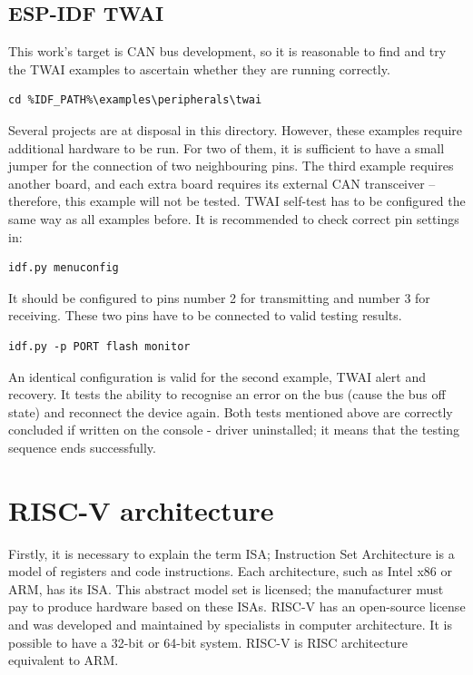 \documentclass{ctuthesis}
\begin{document}
 \subsection{ESP-IDF TWAI}
 This work’s target is CAN bus development, so it is reasonable to find and try the TWAI examples to ascertain whether they are running correctly.
\begin{verbatim}
cd %IDF_PATH%\examples\peripherals\twai
\end{verbatim}
Several projects are at disposal in this directory.  However, these examples require additional hardware to be run. For two of them, it is sufficient to have a small jumper for the connection of two neighbouring pins. The third example requires another board, and each extra board requires its external CAN transceiver – therefore, this example will not be tested.
TWAI self-test has to be configured the same way as all examples before. It is recommended to check correct pin settings in:
\begin{verbatim}
idf.py menuconfig
\end{verbatim}
It should be configured to pins number 2 for transmitting and number 3 for receiving. These two pins have to be connected to valid testing results.
\begin{verbatim}
idf.py -p PORT flash monitor
\end{verbatim}
An identical configuration is valid for the second example, TWAI alert and recovery. It tests the ability to recognise an error on the bus (cause the bus off state) and reconnect the device again. Both tests mentioned above are correctly concluded if written on the console - driver uninstalled; it means that the testing sequence ends successfully.

 \section{RISC-V architecture}
  Firstly, it is necessary to explain the term ISA; Instruction Set Architecture is a model of registers and code instructions\cite{risc-v}. Each architecture, such as Intel x86 or ARM, has its ISA. This abstract model set is licensed; the manufacturer must pay to produce hardware based on these ISAs. RISC-V has an open-source license and was developed and maintained by specialists in computer architecture. It is possible to have a 32-bit or 64-bit system. RISC-V is RISC architecture equivalent to ARM.

\end{document}
